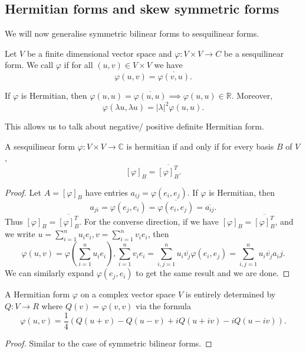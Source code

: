 \documentclass[a4paper]{scrartcl}
\begin{document}
\subsection{Hermitian forms and skew symmetric forms}
We will now generalise symmetric bilinear forms to sesquilinear forms.
\begin{definition}
     Let $V$ be a finite dimensional vector space and $\varphi: V \times V \rightarrow C$ be a sesquilinear form. We call $\varphi$  if for all $(u,v) \in V \times V$ we have 
     \[\varphi (u,v)=\overline{\varphi (v,u)}.\]
\end{definition}
\begin{remark}
     If $\varphi$ is Hermitian, then $\varphi (u,u)=\overline{\varphi (u,u)} \implies \varphi (u,u) \in \mathbb{R}$. Moreover, 
     \[\varphi (\lambda u , \lambda u)= |\lambda|^2 \varphi (u,u).\]
\end{remark}
This allows us to talk about negative/ positive definite Hermitian form.

\begin{lemma}
     A sesquilinear form $\varphi: V \times V \rightarrow \mathbb{C}$ is hermitian if and only if for every basis $B$ of $V$, 
     \[[\varphi]_B=\overline{[\varphi]_B^T}.\]
     
\end{lemma}
\begin{proof}
     Let $A=[\varphi]_B$ have entries $a_{ij}=\varphi(e_i,e_j)$. 
     If $\varphi$ is Hermitian, then 
     \[a_{ji}=\varphi(e_j,e_i)=\overline{\varphi(e_i,e_j)}=\overline{a_{ij}} .\]
     Thus $[\varphi]_B=\overline{[\varphi]_B^T}.$\newline 
     For the converse direction, if we have $[\varphi]_B=\overline{[\varphi]_B^T}$, and we write $u=\sum_{i=1}^{n}u_i e_i, v=\sum_{i=1}^{n}v_i e_i$, then 
     \[\varphi \left(u,v\right)=\varphi \left(\sum_{i=1}^{n}u_i e_i\right), \sum_{i=1}^{n}v_ie_i=\sum_{i,j=1}^{n}u_i \overline{v_j} \varphi \left(e_i,e_j\right)=\sum_{i,j=1}^{n}u_i \overline{v_j} a_ij.\]
     We can similarly expand $\varphi(e_j,e_i)$ to get the same result and we are done.
\end{proof}

\begin{proposition}
      A Hermitian form $\varphi$ on a complex vector space $V$ is entirely determined by $Q:V \rightarrow R$ where $Q(v)=\varphi \left(v,v\right)$ via the formula 
      \[\varphi \left(u,v\right)=\frac{1}{4}\left(Q \left(u+v\right)-Q \left(u-v\right)+iQ \left(u+iv\right)-iQ \left(u-iv\right)\right).\]
\end{proposition}
\begin{proof}
      Similar to the case of symmetric bilinear forms.
\end{proof}
\end{document}
